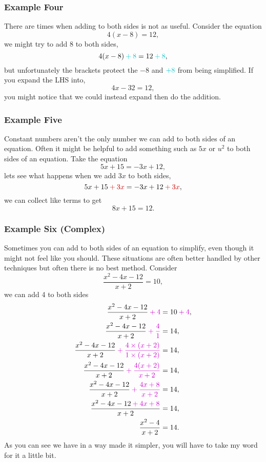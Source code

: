 \documentclass[a4paper,12pt]{article}
\begin{document}
\subsubsection*{Example Four}

There are times when adding to both sides is not as useful. 
Consider the equation
$$4(x - 8) = 12,$$
we might try to add {\color{Turquoise3}8} to both sides,
$$4(x - 8) \color{Turquoise3}+ 8\color{black} = 12 \color{Turquoise3}+ 8\color{black},$$
but unfortunately the brackets protect the $-8$ and 
$\color{Turquoise3}+8$ from being simplified. If you expand the
LHS into,
$$4x - 32 = 12,$$
you might notice that we could instead expand then do the addition.

\subsubsection*{Example Five}

Constant numbers aren't the only number we can add to both
sides of an equation. Often it might be helpful to add something
such as $5x$ or $u^2$ to both sides of an equation. Take
the equation
$$5x + 15 = -3x + 12,$$
lets see what happens when we add {\color{Red3}$3x$} to both
sides,
$$5x + 15 \color{Red3} + 3x\color{black} = -3x + 12 \color{Red3} + 3x\color{black},$$
we can collect like terms to get
$$8x + 15 = 12.$$

\subsubsection*{Example Six (Complex)}

Sometimes you can add to both sides of an equation to simplify, 
even though it might not feel like you should. These situations 
are often better handled by other techniques but often there 
is no best method. Consider
$$\frac{x^2 - 4x - 12}{x + 2} = 10,$$
we can add {\color{Magenta3}4} to both sides
\begin{align*}
\frac{x^2 - 4x - 12}{x + 2}\color{Magenta3} + 4\color{black} &= 10 \color{Magenta3} + 4 \color{black}, \\
\frac{x^2 - 4x - 12}{x + 2}\color{Magenta3} + \frac{4}{1}\color{black} &= 14, \\
\frac{x^2 - 4x - 12}{x + 2}\color{Magenta3} + \frac{4\times(x + 2)}{1\times(x + 2)}\color{black} &= 14, \\
\frac{x^2 - 4x - 12}{x + 2}\color{Magenta3} + \frac{4(x + 2)}{x + 2}\color{black} &= 14, \\
\frac{x^2 - 4x - 12}{x + 2}\color{Magenta3} + \frac{4x + 8}{x + 2}\color{black} &= 14, \\
\frac{x^2 - 4x - 12 \color{Magenta3} + 4x + 8}{x + 2} &= 14, \\
\frac{x^2 - 4}{x+2} &= 14.
\end{align*}
As you can see we have in a way made it simpler, you will have to 
take my word for it a little bit.
\end{document}
